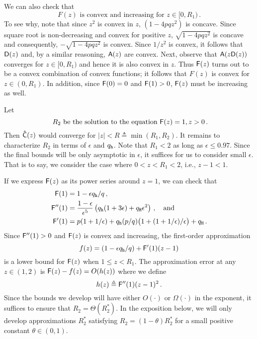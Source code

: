  We can also check that 
  \begin{equation}\label{eq:Fz-convex-increasing}
    \text{$F(z)$ is convex and increasing for $z \in [0, R_1)$}
    \,.
  \end{equation} 
  To see why, note that since $z^2$ is convex in $z$, 
  $(1 - 4pq z^2)$ is concave. 
  Since square root is non-decreasing and convex for positive $z$, 
  $\sqrt{1 - 4pqz^2}$ is concave and consequently, 
  $-\sqrt{1 - 4pqz^2}$ is convex. 
  Since $1/z^2$ is convex, 
  it follows that $\mathsf{D}(z)$ and, by a similar reasoning, $\mathsf{A}(z)$ are convex.
  Next, observe that $\mathsf{A}(z \mathsf{D}(z))$ converges for $z \in [0, R_1)$ 
  and hence it is also convex in $z$. 
  Thus $\mathsf{F}(z)$ turns out to be a convex combination of convex functions; 
  it follows that $F(z)$ is convex for $z \in (0, R_1)$. 
  In addition, 
  since $\mathsf{F}(0) = 0$ and $\mathsf{F}(1) > 0$, 
  $\mathsf{F}(z)$ must be increasing as well. 


  Let $$\text{ $R_2$ be the solution to the equation $\mathsf{F}(z) = 1, z > 0$}\,. $$ 
  Then $\mathsf{\hat{C}}(z)$ would converge for $|z| < R \triangleq \min(R_1, R_2)$. 
  It remains to characterize $R_2$ in terms of $\epsilon$ and $q_{\mathtt{h}}$. 
  Note that $R_1 < 2$ as long as $\epsilon \leq 0.97$.
  Since the final bounds will be only asymptotic in $\epsilon$, 
  it suffices for us to consider small $\epsilon$. 
  That is to say, we consider the case where $0 < z < R_1 < 2$, 
  i.e., $z - 1 < 1$.

  If we express $\mathsf{F}(z)$ as its power series around $z = 1$, we can check that 
  \begin{align*}
    \mathsf{F}(1) &= 1 - \epsilon q_{\mathtt{h}}/q\,,\\
    \mathsf{F}''(1) &= 
      \frac{1-\epsilon}{\epsilon^5}\left( q_{\mathtt{h}} (1+3\epsilon) + q_{\mathtt{H}} \epsilon^2 \right)\,, \quad\text{and}\\
    \mathsf{F}'(1) &= p(1+1/\epsilon) + q_{\mathtt{h}}(p/q)\bigl( 1+(1+1/\epsilon)/\epsilon \bigr) + q_{\mathtt{H}}
    \,.
  \end{align*}
  Since $\mathsf{F}''(1) > 0$ and $\mathsf{F}(z)$ is convex and increasing, 
  the first-order approximation 
  \begin{equation}
    f(z) = (1 - \epsilon q_{\mathtt{h}}/q) + \mathsf{F}'(1)(z-1) 
  \end{equation}
  is a lower bound for $\mathsf{F}(z)$ when $1 \leq z < R_1$. 
  The approximation error at any $z \in (1, 2)$ is 
  $\mathsf{F}(z) - f(z) = O(h(z))$ 
  where we define $$h(z) \triangleq \mathsf{F}''(1) (z-1)^2\,.$$
  Since the bounds we develop will have 
  either $O(\cdot)$ or $\Omega(\cdot)$ in the exponent, 
  it suffices to ensure that $R_2 = \Theta(R_2^*)$.
  In the exposition below, 
  we will only develop approximations $R_2^*$ satisfying 
  $R_2 = (1 - \theta) R_2^*$ 
  for a small positive constant $\theta \in (0, 1)$. 

